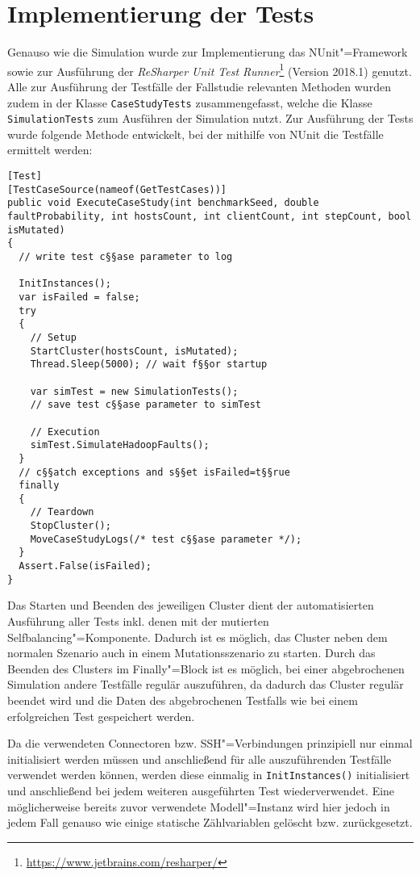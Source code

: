 \section{Implementierung der Tests}
\label{sec:implTestcases}

Genauso wie die Simulation wurde zur Implementierung das NUnit"=Framework sowie zur Ausführung der \emph{ReSharper Unit Test Runner}\footnote{\url{https://www.jetbrains.com/resharper/}} (Version 2018.1) genutzt.
Alle zur Ausführung der Testfälle der Fallstudie relevanten Methoden wurden zudem in der Klasse \texttt{CaseStudyTests} zusammengefasst, welche die Klasse \texttt{SimulationTests} zum Ausführen der Simulation nutzt.
Zur Ausführung der Tests wurde folgende Methode entwickelt, bei der mithilfe von NUnit die Testfälle ermittelt werden:

\begin{lstlisting}[label=lst:executeTestCases,style=cs,
caption={[Methode zur Ausführung der Tests der Fallstudie]
    Methode zur Ausführung der der Tests der Fallstudie (gekürzt)}]
[Test]
[TestCaseSource(nameof(GetTestCases))]
public void ExecuteCaseStudy(int benchmarkSeed, double faultProbability, int hostsCount, int clientCount, int stepCount, bool isMutated)
{
  // write test c§§ase parameter to log
  
  InitInstances();
  var isFailed = false;
  try
  {
    // Setup
    StartCluster(hostsCount, isMutated);
    Thread.Sleep(5000); // wait f§§or startup
    
    var simTest = new SimulationTests();
    // save test c§§ase parameter to simTest
    
    // Execution
    simTest.SimulateHadoopFaults();
  }
  // c§§atch exceptions and s§§et isFailed=t§§rue
  finally
  {
    // Teardown
    StopCluster();
    MoveCaseStudyLogs(/* test c§§ase parameter */);
  }
  Assert.False(isFailed);
}
\end{lstlisting}

Das Starten und Beenden des jeweiligen Cluster dient der automatisierten Ausführung aller Tests inkl. denen mit der mutierten Selfbalancing"=Komponente.
Dadurch ist es möglich, das Cluster neben dem normalen Szenario auch in einem Mutationsszenario zu starten.
Durch das Beenden des Clusters im Finally"=Block ist es möglich, bei einer abgebrochenen Simulation andere Testfälle regulär auszuführen, da dadurch das Cluster regulär beendet wird und die Daten des abgebrochenen Testfalls wie bei einem erfolgreichen Test gespeichert werden.

Da die verwendeten Connectoren bzw. SSH"=Verbindungen prinzipiell nur einmal initialisiert werden müssen und anschließend für alle auszuführenden Testfälle verwendet werden können, werden diese einmalig in \texttt{InitInstances()} initialisiert und anschließend bei jedem weiteren ausgeführten Test wiederverwendet.
Eine möglicherweise bereits zuvor verwendete Modell"=Instanz wird hier jedoch in jedem Fall genauso wie einige statische Zählvariablen gelöscht bzw. zurückgesetzt.

